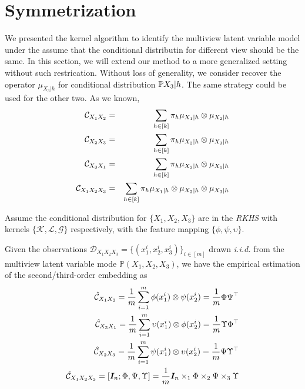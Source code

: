 \documentclass{article}
\begin{document}
\section{Symmetrization}
We presented the kernel algorithm to identify the multiview latent variable model under the assume that the conditional distributin for different view should be the same. In this section, we will extend our method to a more generalized setting without such restrication. Without loss of generality, we consider recover the operator $\mu_{X_3|h}$ for conditional distribution $\mathbb{P}{X_3|h}$. The same strategy could be used for the other two. As we known,
%
\begin{eqnarray*}
\mathcal{C}_{X_1 X_2} &=& \sum_{h \in [k]} \pi_h \mu_{X_1|h}\otimes \mu_{X_2|h}\\
\mathcal{C}_{X_2 X_3} &=& \sum_{h \in [k]} \pi_h \mu_{X_2|h}\otimes \mu_{X_3|h}\\
\mathcal{C}_{X_3 X_1} &=& \sum_{h \in [k]} \pi_h \mu_{X_3|h}\otimes \mu_{X_1|h}\\
\mathcal{C}_{X_1 X_2 X_3} &=& \sum_{h \in [k]} \pi_h \mu_{X_1|h}\otimes \mu_{X_2|h} \otimes \mu_{X_3|h}\\
\end{eqnarray*}
%

Assume the conditional distribution for $\{X_1, X_2, X_3\}$ are in the \textit{RKHS} with kernels $\{\mathcal{K, L, G}\}$ respectively, with the feature mapping $\{\phi,\psi, \upsilon\}$.

Given the observations $\mathcal{D}_{X_1X_2X_3}=\{(x_1^i, x_2^i, x_3^i)\}_{i\in[m]}$ drawn \emph{i.i.d.} from the multiview latent variable mode $\mathbb{P}(X_1, X_2, X_3)$, we have the empirical estimation of the second/third-order embedding as
%
\begin{eqnarray*}
\hat{\mathcal{C}}_{X_1 X_2} = \frac{1}{m} \sum_{i=1}^m \phi(x_1^i)\otimes \psi(x_2^i) = \frac{1}{m}\Phi \Psi^\top\\
\hat{\mathcal{C}}_{X_3 X_1} = \frac{1}{m} \sum_{i=1}^m \upsilon(x_1^i)\otimes \phi(x_2^i) = \frac{1}{m}\Upsilon \Phi^\top\\
\hat{\mathcal{C}}_{X_2 X_3} = \frac{1}{m} \sum_{i=1}^m \psi(x_1^i)\otimes \upsilon(x_2^i) = \frac{1}{m}\Psi \Upsilon^\top\\
\hat{\mathcal{C}}_{X_1 X_2 X_3}= [\bm{I}_n; \Phi, \Psi, \Upsilon] =
\frac{1}{m}\bm{I}_n \times_1 \Phi \times_2 \Psi \times_3 \Upsilon
\end{eqnarray*}
%
\end{document}
